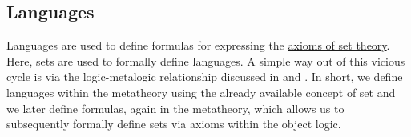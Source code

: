 \subsection{Languages}\label{subsec:languages}

\begin{remark}\label{rem:language_definitions_using_sets}
  Languages are used to define formulas for expressing the \hyperref[def:set]{axioms of set theory}. Here, sets are used to formally define languages. A simple way out of this vicious cycle is via the logic-metalogic relationship discussed in  and . In short, we define languages within the metatheory using the already available concept of set and we later define formulas, again in the metatheory, which allows us to subsequently formally define sets via axioms within the object logic.
\end{remark}

